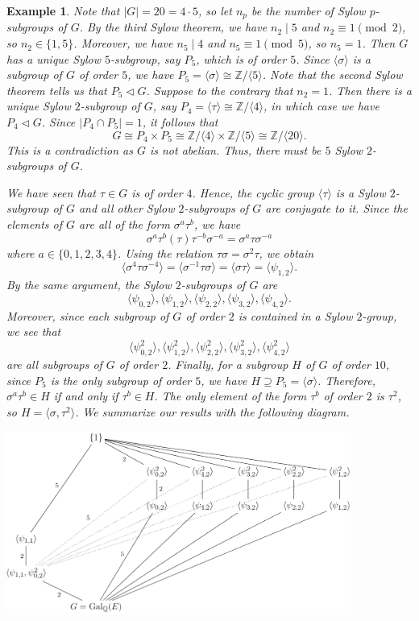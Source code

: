 \documentclass[10pt]{article}
\newcommand{\Z}{\mathbb{Z}}
\newcommand{\norm}{\triangleleft}
\theoremstyle{newstyle}
\newtheorem{exmp}[thm]{Example}
\begin{document}
\begin{exmp}
Note that $|G| = 20 = 4 \cdot 5$, so let $n_p$ be the number of Sylow $p$-subgroups of $G$. 
By the third Sylow theorem, we have $n_2 \mid 5$ and $n_2 \equiv 1 \pmod 2$, so $n_2 \in \{1, 5\}$. 
Moreover, we have $n_5 \mid 4$ and $n_5 \equiv 1 \pmod 5$, so $n_5 = 1$. Then 
$G$ has a unique Sylow $5$-subgroup, say $P_5$, which is of order $5$. Since 
$\langle \sigma \rangle$ is a subgroup of $G$ of order $5$, we have 
$P_5 = \langle \sigma \rangle \cong \Z/\langle 5 \rangle$. Note that the second Sylow theorem 
tells us that $P_5 \norm G$. Suppose to the contrary that $n_2 = 1$. Then there is a unique 
Sylow $2$-subgroup of $G$, say $P_4 = \langle \tau \rangle \cong \Z/\langle 4 \rangle$, 
in which case we have $P_4 \norm G$. Since $|P_4 \cap P_5| = 1$, it follows that 
\[ G \cong P_4 \times P_5 \cong \Z/\langle 4 \rangle \times \Z/\langle 5 \rangle \cong 
\Z/\langle 20 \rangle. \]
This is a contradiction as $G$ is not abelian. Thus, there must be $5$ Sylow $2$-subgroups of $G$. 

We have seen that $\tau \in G$ is of order $4$. Hence, the cyclic group $\langle \tau \rangle$ 
is a Sylow $2$-subgroup of $G$ and all other Sylow $2$-subgroups of $G$ are conjugate to it. 
Since the elements of $G$ are all of the form $\sigma^a \tau^b$, we have 
\[ \sigma^a\tau^b(\tau)\tau^{-b}\sigma^{-a} = \sigma^a \tau \sigma^{-a} \]
where $a \in \{0, 1, 2, 3, 4\}$. Using the relation $\tau\sigma = \sigma^2\tau$, we obtain 
\[ \langle \sigma^4 \tau \sigma^{-4} \rangle = \langle \sigma^{-1}\tau\sigma \rangle 
= \langle \sigma\tau \rangle = \langle \psi_{1,2} \rangle. \]
By the same argument, the Sylow $2$-subgroups of $G$ are 
\[ \langle \psi_{0,2} \rangle, \langle \psi_{1,2} \rangle, \langle \psi_{2,2} \rangle, \langle \psi_{3,2} \rangle, \langle \psi_{4,2} \rangle. \]
Moreover, since each subgroup of $G$ of order $2$ is contained in a Sylow $2$-group, we see that 
\[ \langle \psi_{0,2}^2 \rangle, \langle \psi_{1,2}^2 \rangle, \langle \psi_{2,2}^2 \rangle, \langle \psi_{3,2}^2 \rangle, \langle \psi_{4,2}^2 \rangle \]
are all subgroups of $G$ of order $2$. Finally, for a subgroup $H$ of $G$ of order $10$, 
since $P_5$ is the only subgroup of order $5$, we have $H \supseteq P_5 = \langle \sigma \rangle$. 
Therefore, $\sigma^a \tau^b \in H$ if and only if $\tau^b \in H$. The only element 
of the form $\tau^b$ of order $2$ is $\tau^2$, so $H = \langle \sigma, \tau^2 \rangle$. 
We summarize our results with the following diagram. 

\begin{center} \includegraphics[width=0.85\textwidth]{9-14-2.png} \end{center}


\end{exmp}
\end{document}
